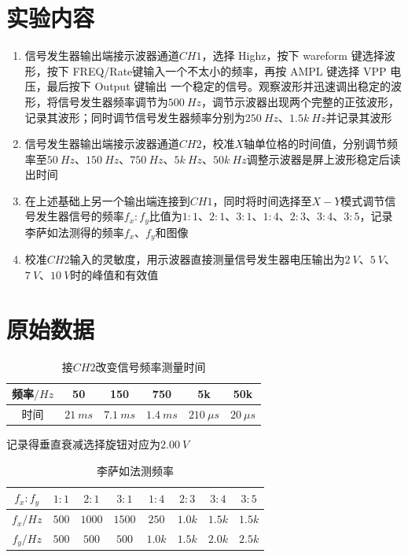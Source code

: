 \documentclass[UTF8]{ctexart}
\title{}
\author{}
\date{}
\begin{document}
\begin{titlepage}		
		
\end{titlepage}

\section{实验内容}

\begin{enumerate}
    \item 信号发生器输出端接示波器通道$CH1$，选择 Highz，按下 wareform 键选择波形，按下 FREQ/Rate键输入一个不太小的频率，再按 AMPL 键选择 VPP 电压，最后按下 Output 键输出
    一个稳定的信号。观察波形并迅速调出稳定的波形，将信号发生器频率调节为$500\ Hz$，调节示波器出现两个完整的正弦波形，记录其波形；同时调节信号发生器频率分别为$250\ Hz$、$1.5k \ Hz $并记录其波形
    \item 信号发生器输出端接示波器通道$CH2$，校准$X$轴单位格的时间值，分别调节频率至$50 \ Hz$、$150 \ Hz$、$750 \ Hz$、$5k \ Hz$、$50k \ Hz$调整示波器是屏上波形稳定后读出时间
    \item 在上述基础上另一个输出端连接到$CH1$，同时将时间选择至$X-Y$模式调节信号发生器信号的频率$f_x :f_y$比值为$1:1$、$2:1$、$3:1$、$1:4$、$2:3$、$3:4$、$3:5$，记录李萨如法测得的频率$f_x$、$f_y$和图像
    \item 校准$CH2$输入的灵敏度，用示波器直接测量信号发生器电压输出为$2\ V$、$5 \ V$、$7 \ V$、$10 \ V$时的峰值和有效值
\end{enumerate}


\section{原始数据}
\begin{table}[H]
    \centering
    \caption{接$CH2$改变信号频率测量时间}
    \begin{tabular}{|c|c|c|c|c|c|}
    \hline
         频率$/Hz$ & 50 & 150 & 750 & 5k & 50k \\
    \hline
         时间 & $21 \ ms$  & $7.1 \ ms$ & $ 1.4 \ ms$ & $210 \ \mu s$ & $20 \ \mu s$ \\
    \hline
    \end{tabular}
\end{table}
记录得垂直衰减选择旋钮对应为$2.00 \ V$
\begin{table}[H]
    \centering
    \caption{李萨如法测频率}
    \begin{tabular}{|c|c|c|c|c|c|c|c|}
    \hline
         $f_x :f_y$ & $1:1$ & $2:1$ & $3:1$ & $1:4$ & $2:3$ & $3:4$ & $3:5$ \\
    \hline
          $f_x/ Hz$  & $500$  & $1000$ & $1500$ & $250$  & $1.0k$ & $1.5k$ & $1.5k$ \\
    \hline
           $f_y/ Hz$  & $500$  & $500$ & $500$ & $1.0k$  & $1.5k$ & $2.0k$ & $2.5k$ \\
    \hline 
    \end{tabular}
\end{table}
\end{document}

